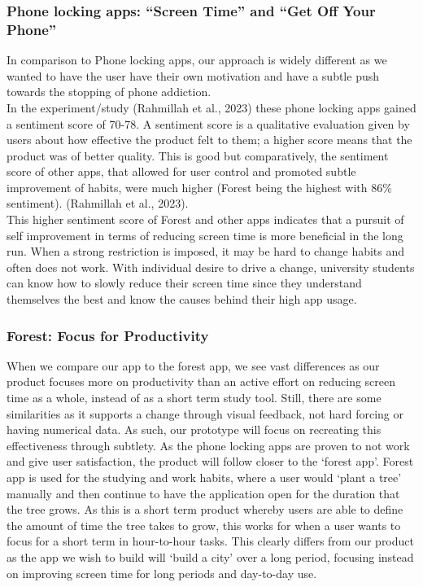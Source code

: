 \documentclass[sigconf, 11pt]{acmart}
\begin{document}
\subsubsection{Phone locking apps: “Screen Time” and “Get Off Your Phone”}
In comparison to Phone locking apps, our approach is widely different as we wanted to have the user have their own motivation and have a subtle push towards the stopping of phone addiction.
\\

In the experiment/study (Rahmillah et al., 2023) these phone locking apps gained a sentiment score of 70-78. A sentiment score is a qualitative evaluation given by users about how effective the product felt to them; a higher score means that the product was of better quality. This is good but comparatively, the sentiment score of other apps, that allowed for user control and promoted subtle improvement of habits, were much higher (Forest being the highest with 86\% sentiment). (Rahmillah et al., 2023).
\\

This higher sentiment score of Forest and other apps indicates that a pursuit of self improvement in terms of reducing screen time is more beneficial in the long run. When a strong restriction is imposed, it may be hard to change habits and often does not work. With individual desire to drive a change, university students can know how to slowly reduce their screen time since they understand themselves the best and know the causes behind their high app usage. 


\subsubsection{Forest: Focus for Productivity}
When we compare our app to the forest app, we see vast differences as our product focuses more on productivity than an active effort on reducing screen time as a whole, instead of as a short term study tool. Still, there are some similarities as it supports a change through visual feedback, not hard forcing or having numerical data. As such, our prototype will focus on recreating this effectiveness through subtlety.
As the phone locking apps are proven to not work and give user satisfaction, the product will follow closer to the ‘forest app’. Forest app is used for the studying and work habits, where a user would ‘plant a tree’ manually and then continue to have the application open for the duration that the tree grows. As this is a short term product whereby users are able to define the amount of time the tree takes to grow, this works for when a user wants to focus for a short term in hour-to-hour tasks. This clearly differs from our product as the app we wish to build will ‘build a city’ over a long period, focusing instead on improving screen time for long periods and day-to-day use.
\\
\end{document}
